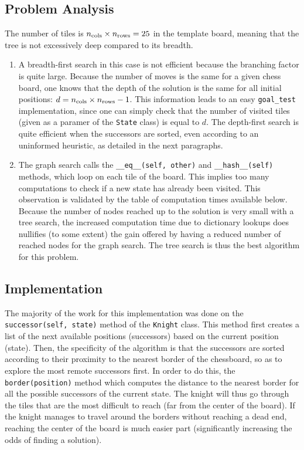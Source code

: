 \documentclass[journal]{IEEEtran}
\newcommand{\py}[1]{\texttt{#1}}
\begin{document}
 \subsection{Problem Analysis}
 The number of tiles is \(n_{\textnormal{cols}} \times n_{\textnormal{\vphantom{l}rows}} = 25\) in the template board, meaning that the tree is not excessively deep compared to its breadth.
 \begin{enumerate}
  \item A breadth-first search in this case is not efficient because the branching factor is quite large.
  Because the number of moves is the same for a given chess board, one knows that the depth of the solution is the same for all initial positions: \(d = n_{\textnormal{cols}} \times n_{\textnormal{\vphantom{l}rows}} - 1\).
  This information leads to an easy \py{goal_test} implementation, since one can simply check that the number of visited tiles (given as a paramer of the \py{State} class) is equal to \(d\).
  The depth-first search is quite efficient when the successors are sorted, even according to an uninformed heuristic, as detailed in the next paragraphs.
  \item The graph search calls the \py{__eq__(self, other)} and \py{__hash__(self)} methods, which loop on each tile of the board.
  This implies too many computations to check if a new state has already been visited.
  This observation is validated by the table of computation times available below.
  Because the number of nodes reached up to the solution is very small with a tree search, the increased computation time due to dictionary lookups does nullifies (to some extent) the gain offered by having a reduced number of reached nodes for the graph search.
  The tree search is thus the best algorithm for this problem.
 \end{enumerate}
 \subsection{Implementation} The majority of the work for this implementation was done on the \py{successor(self, state)} method of the \py{Knight} class.
 This method first creates a list of the next available positions (successors) based on the current position (state).
 Then, the specificity of the algorithm is that the successors are sorted according to their proximity to the nearest border of the chessboard, so as to explore the most remote successors first.
 In order to do this, the \py{border(position)} method which computes the distance to the nearest border for all the possible successors of the current state.
 The knight will thus go through the tiles that are the most difficult to reach (far from the center of the board).
 If the knight manages to travel around the borders without reaching a dead end, reaching the center of the board is much easier part (significantly increasing the odds of finding a solution).
 
\end{document}
